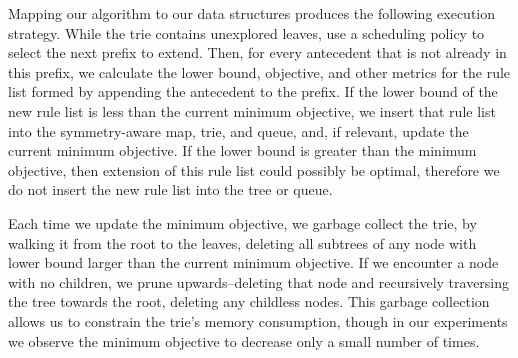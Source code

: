 Mapping our algorithm to our data structures produces the following execution strategy.
While the trie contains unexplored leaves, use a scheduling policy to select
the next prefix to extend.
Then, for every antecedent that is not already in this prefix, we calculate the lower bound,
objective, and other metrics for the rule list formed by appending the antecedent to the prefix.
If the lower bound of the new rule list is less than the current minimum objective, we insert that
rule list into the symmetry-aware map, trie, and queue, and, if relevant, update the
current minimum objective.
If the lower bound is greater than the minimum objective,
then extension of this rule list could possibly be optimal,
therefore we do not insert the new rule list into the tree or queue.

Each time we update the minimum objective, we garbage collect the trie, by walking it
from the root to the leaves, deleting all subtrees of any node with lower bound larger than the current
minimum objective. If we encounter a node with no children, we prune upwards--deleting that
node and recursively traversing the tree towards the root, deleting any childless nodes.
This garbage collection allows us to constrain the trie's memory consumption, though in our
experiments we observe the minimum objective to decrease only a small number of times.


